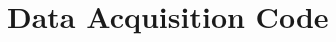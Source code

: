 \documentclass[main.tex]{subfiles}
\begin{document}
	\chapter{Data Acquisition Code}\label{ch:daq}
	
\end{document}
